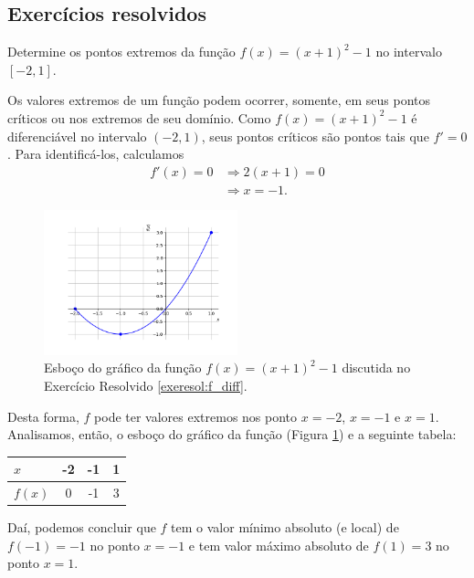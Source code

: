 \subsection{Exercícios resolvidos}

\begin{exeresol}\label{exeresol:f_diff}
  Determine os pontos extremos da função $f(x) = (x+1)^2-1$ no intervalo $[-2,1]$.
\end{exeresol}
\begin{resol}
  Os valores extremos de um função podem ocorrer, somente, em seus pontos críticos ou nos extremos de seu domínio. Como $f(x) = (x+1)^2-1$ é diferenciável no intervalo $(-2,1)$, seus pontos críticos são pontos tais que $f'=0$. Para identificá-los, calculamos
  \begin{align}
    f'(x)=0 &\Rightarrow 2(x+1) = 0\\
            &\Rightarrow x = -1.
  \end{align}

  \begin{figure}[H]
    \centering
    \includegraphics[width=0.5\textwidth]{./cap_apderiv/dados/fig_exeresol_f_diff/fig_exeresol_f_diff}
    \caption{Esboço do gráfico da função $f(x) = (x+1)^2-1$ discutida no Exercício Resolvido \ref{exeresol:f_diff}.}
    \label{fig:exeresol_f_diff}
  \end{figure}

  Desta forma, $f$ pode ter valores extremos nos ponto $x=-2$, $x=-1$ e $x=1$. Analisamos, então, o esboço do gráfico da função (Figura \ref{fig:exeresol_f_diff}) e a seguinte tabela:\\
  \begin{center}
  \begin{tabular}[H]{l|ccc}
    $x$ & -2 & -1 & 1 \\\hline
    $f(x)$ & 0 & -1 & 3\\\hline
  \end{tabular}
\end{center}
Daí, podemos concluir que $f$ tem o valor mínimo absoluto (e local) de $f(-1)=-1$ no ponto $x=-1$ e tem valor máximo absoluto de $f(1)=3$ no ponto $x=1$.


\end{resol}
